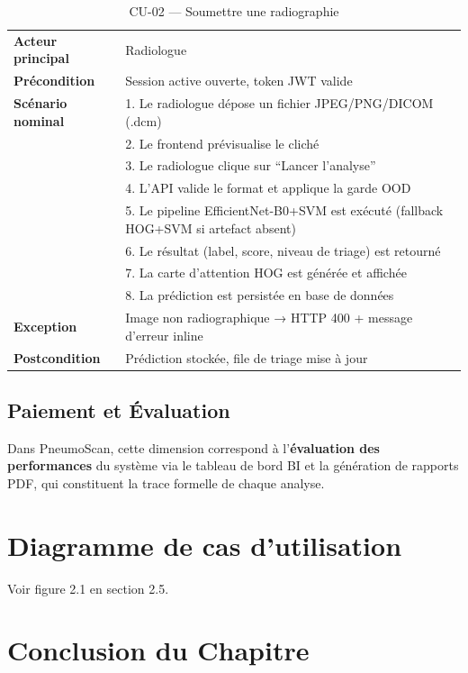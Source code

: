 \documentclass[12pt, a4paper]{report}
\begin{document}
\begin{table}[H]
\centering
\caption{CU-02 --- Soumettre une radiographie}
\begin{tabularx}{\textwidth}{L{3.5cm} X}
\toprule
\textbf{Acteur principal} & Radiologue \\
\textbf{Précondition} & Session active ouverte, token JWT valide \\
\textbf{Scénario nominal} & 1. Le radiologue dépose un fichier JPEG/PNG/DICOM (.dcm) \\
 & 2. Le frontend prévisualise le cliché \\
 & 3. Le radiologue clique sur ``Lancer l'analyse'' \\
 & 4. L'API valide le format et applique la garde OOD \\
 & 5. Le pipeline EfficientNet-B0+SVM est exécuté (fallback HOG+SVM si artefact absent) \\
 & 6. Le résultat (label, score, niveau de triage) est retourné \\
 & 7. La carte d'attention HOG est générée et affichée \\
 & 8. La prédiction est persistée en base de données \\
\textbf{Exception} & Image non radiographique → HTTP 400 + message d'erreur inline \\
\textbf{Postcondition} & Prédiction stockée, file de triage mise à jour \\
\bottomrule
\end{tabularx}
\end{table}

\subsection{Paiement et Évaluation}

Dans PneumoScan, cette dimension correspond à l'\textbf{évaluation des performances}
du système via le tableau de bord BI et la génération de rapports PDF,
qui constituent la trace formelle de chaque analyse.

\section{Diagramme de cas d'utilisation}

Voir figure 2.1 en section 2.5.

\section{Conclusion du Chapitre}
\end{document}
